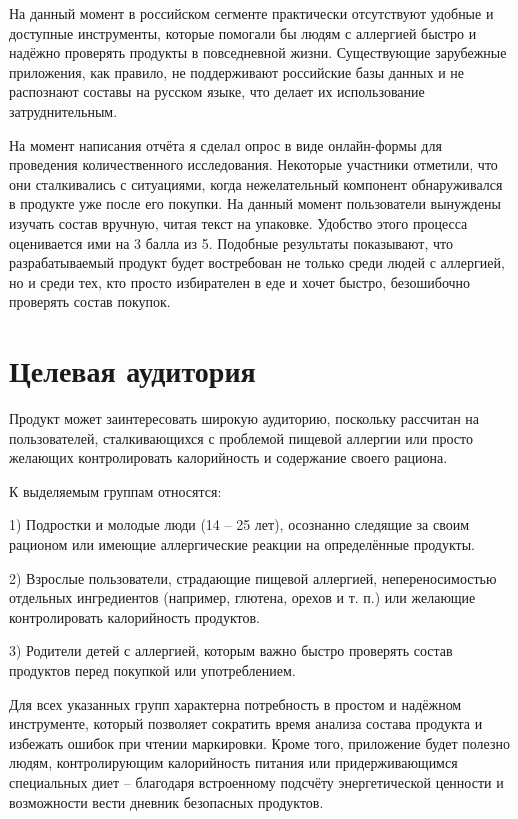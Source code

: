 \documentclass[14pt,a4paper]{extarticle}
\begin{document}
На данный момент в российском сегменте практически отсутствуют удобные и доступные инструменты, которые помогали бы людям с аллергией быстро и надёжно проверять продукты в повседневной жизни. Существующие зарубежные приложения, как правило, не поддерживают российские базы данных и не распознают составы на русском языке, что делает их использование затруднительным.

На момент написания отчёта я сделал опрос в виде онлайн-формы для проведения количественного исследования. Некоторые участники отметили, что они сталкивались с ситуациями, когда нежелательный компонент обнаруживался в продукте уже после его покупки. На данный момент пользователи вынуждены изучать состав вручную, читая текст на упаковке. Удобство этого процесса оценивается ими на 3 балла из 5. Подобные результаты показывают, что разрабатываемый продукт будет востребован не только среди людей с аллергией, но и среди тех, кто просто избирателен в еде и хочет быстро, безошибочно проверять состав покупок.


\section{Целевая аудитория}

Продукт может заинтересовать широкую аудиторию, поскольку рассчитан на пользователей, сталкивающихся с проблемой пищевой аллергии или просто желающих контролировать калорийность и содержание своего рациона.

К выделяемым группам относятся:

1) Подростки и молодые люди (14 – 25 лет), осознанно следящие за своим рационом или имеющие аллергические реакции на определённые продукты.

2) Взрослые пользователи, страдающие пищевой аллергией, непереносимостью отдельных ингредиентов (например, глютена, орехов и т. п.) или желающие контролировать калорийность продуктов.

3) Родители детей с аллергией, которым важно быстро проверять состав продуктов перед покупкой или употреблением.

Для всех указанных групп характерна потребность в простом и надёжном инструменте, который позволяет сократить время анализа состава продукта и избежать ошибок при чтении маркировки. Кроме того, приложение будет полезно людям, контролирующим калорийность питания или придерживающимся специальных диет – благодаря встроенному подсчёту энергетической ценности и возможности вести дневник безопасных продуктов.
\end{document}
